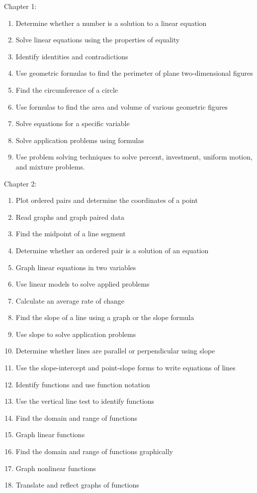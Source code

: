 \documentclass[11pt]{article}
\newenvironment{alphalist}{
\begin{enumerate}[label=(\arabic*),widest=107 ,leftmargin=25pt, itemsep=0pt]}
{\end{enumerate}}
\begin{document}
\noindent Chapter 1:
\begin{alphalist}
    \item Determine whether a number is a solution to a linear equation
    \item Solve linear equations using the properties of equality
    \item Identify identities and contradictions
    \item Use geometric formulas to find the perimeter of plane two-dimensional figures
    \item Find the circumference of a circle
    \item Use formulas to find the area and volume of various geometric figures
    \item Solve equations for a specific variable
    \item Solve application problems using formulas
    \item Use problem solving techniques to solve percent, investment, uniform motion, and mixture problems.
\end{alphalist}
\noindent Chapter 2:
\begin{alphalist}
    \item Plot ordered pairs and determine the coordinates of a point
    \item Read graphs and graph paired data
    \item Find the midpoint of a line segment
    \item Determine whether an ordered pair is a solution of an equation
    \item Graph linear equations in two variables
    \item Use linear models to solve applied problems
    \item Calculate an average rate of change
    \item Find the slope of a line using a graph or the slope formula
    \item Use slope to solve application problems
    \item Determine whether lines are parallel or perpendicular using slope
    \item Use the slope-intercept and point-slope forms to write equations of lines
    \item Identify functions and use function notation
    \item Use the vertical line test to identify functions
    \item Find the domain and range of functions
    \item Graph linear functions
    \item Find the domain and range of functions graphically
    \item Graph nonlinear functions
    \item Translate and reflect graphs of functions
\end{alphalist}
 
\end{document}
